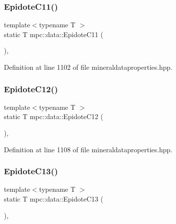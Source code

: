 \subsubsection{\texorpdfstring{Epidote\+C11()}{EpidoteC11()}}
{\footnotesize\ttfamily template$<$typename T $>$ \\
static T mpc\+::data\+::\+Epidote\+C11 (\begin{DoxyParamCaption}{ }\end{DoxyParamCaption})\hspace{0.3cm}{\ttfamily [inline]}, {\ttfamily [static]}}



Definition at line 1102 of file mineraldataproperties.\+hpp.

\mbox{\label{namespacempc_1_1data_a1d13cf3e4bf95e89f732485f97ef30f2}} 
\subsubsection{\texorpdfstring{Epidote\+C12()}{EpidoteC12()}}
{\footnotesize\ttfamily template$<$typename T $>$ \\
static T mpc\+::data\+::\+Epidote\+C12 (\begin{DoxyParamCaption}{ }\end{DoxyParamCaption})\hspace{0.3cm}{\ttfamily [inline]}, {\ttfamily [static]}}



Definition at line 1108 of file mineraldataproperties.\+hpp.

\mbox{\label{namespacempc_1_1data_ac1c2f272a278696d7ffecfa112c59774}} 
\subsubsection{\texorpdfstring{Epidote\+C13()}{EpidoteC13()}}
{\footnotesize\ttfamily template$<$typename T $>$ \\
static T mpc\+::data\+::\+Epidote\+C13 (\begin{DoxyParamCaption}{ }\end{DoxyParamCaption})\hspace{0.3cm}{\ttfamily [inline]}, {\ttfamily [static]}}



